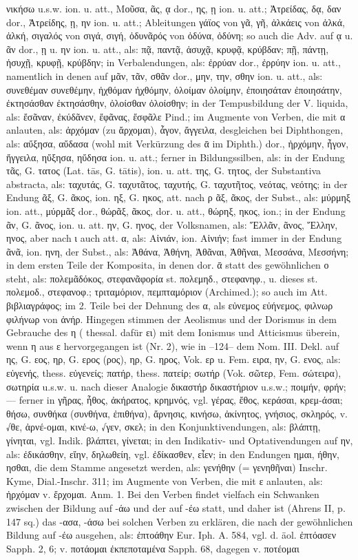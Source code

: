 νικήσω u.s.w. ion. u. att., Μοῦσα, ᾶς, ᾳ dor., ης, ῃ ion. u. att.; Ἀτρείδας, δᾳ, δαν dor., Ἀτρείδης, ῃ, ην ion. u. att.; Ableitungen γάϊος von γᾶ, γῆ, ἀλκάεις von ἀλκά, ἀλκή, σιγαλός von σιγά, σιγή, ὀδυνᾶρός von ὀδύνα, ὀδύνη; so auch die Adv. auf ᾳ u. ᾶν dor., ῃ u. ην ion. u. att., als: πᾷ, παντᾷ, ἁσυχᾷ, κρυφᾷ, κρύβδαν; πῇ, πάντῃ, ἡσυχῇ, κρυφῇ, κρύβδην; in Verbalendungen, als: ἐρρύαν dor., ἐρρύην ion. u. att., namentlich in denen auf μᾶν, τᾶν, σθᾶν dor., μην, την, σθην ion. u. att., als: συνεθέμαν συνεθέμην, ἠχθόμαν ἠχθόμην, ὀλοίμαν ὀλοίμην, ἐποιησάταν ἐποιησάτην, ἐκτησάσθαν ἐκτησάσθην, ὀλοίσθαν ὀλοίσθην; in der Tempusbildung der V. liquida, als: ἔσᾶναν, ἐκύδᾶνεν, ἔφᾶνας, ἔσφᾶλε Pind.; im Augmente von Verben, die mit α anlauten, als: ἀρχόμαν (zu ἄρχομαι), ἆγον, ἄγγειλα, desgleichen bei Diphthongen, als: αὔξησα, αὔδασα (wohl mit Verkürzung des ᾱ im Diphth.) dor., ἠρχόμην, ἦγον, ἤγγειλα, ηὔξησα, ηὔδησα ion. u. att.; ferner in Bildungssilben, als: in der Endung τᾶς, G. τατος (Lat. tās, G. tātis), ion. u. att. της, G. τητος, der Substantiva abstracta, als: ταχυτάς, G. ταχυτᾶτος, ταχυτής, G. ταχυτῆτος, νεότας, νεότης; in der Endung ᾶξ, G. ᾶκος, ion. ηξ, G. ηκος, att. nach ρ ᾶξ, ᾶκος, der Subst., als: μύρμηξ ion. att., μύρμᾶξ dor., θώρᾶξ, ᾶκος, dor. u. att., θώρηξ, ηκος, ion.; in der Endung ᾶν, G. ᾶνος, ion. u. att. ην, G. ηνος, der Volksnamen, als: Ἕλλᾶν, ᾶνος, Ἕλλην, ηνος, aber nach ι auch att. α, als: Αἰνιάν, ion. Αἰνιήν; fast immer in der Endung ᾶνᾶ, ion. ηνη, der Subst., als: Ἀθάνα, Ἀθήνη, Ἀθᾶναι, Ἀθῆναι, Μεσσάνα, Μεσσήνη; in dem ersten Teile der Komposita, in denen dor. ᾱ statt des gewöhnlichen ο steht, als: πολεμᾶδόκος, στεφανᾶφορία st. πολεμηδ., στεφανηφ., u. dieses st. πολεμοδ., στεφανοφ.; τριταμόριον, πεμπταμόριον (Archimed.); so auch im Att. βιβλιαγράφος; im 2. Teile bei der Dehnung des α, als εὐνεμος εὐήνεμος, φιλνωρ φιλήνωρ von ἀνήρ. Hingegen stimmen der Aeolismus und der Dorismus in dem Gebrauche des η ( thessal. dafür ει) mit dem Ionismus und Atticismus überein, wenn η aus ε hervorgegangen ist (Nr. 2), wie in --124-- dem Nom. III. Dekl. auf ης, G. εος, ηρ, G. ερος (ρος), ηρ, G. ηρος, Vok. ερ u. Fem. ειρα, ην, G. ενος, als: εὐγενής,  thess. εὐγενείς; πατήρ,  thess. πατείρ; σωτήρ (Vok. σῶτερ, Fem. σώτειρα), σωτηρία u.s.w. u. nach dieser Analogie δικαστήρ δικαστήριον u.s.w.; ποιμήν, φρήν; — ferner in γῆρας, ἦθος, ἀκήρατος, κρημνός, vgl. γέρας, ἔθος, κεράσαι, κρεμ-άσαι; θήσω, συνθήκα (συνθήνα, ἐπιθήνα), ἄρνησις, κινήσω, ἀκίνητος, γνήσιος, σκληρός, v. √θε, ἀρνέ-ομαι, κινέ-ω, √γεν, σκελ; in den Konjunktivendungen, als: βλάπτῃ, γίνηται, vgl. Indik. βλάπτει, γίνεται; in den Indikativ- und Optativendungen auf ην, als: ἐδικάσθην, εἴην, δηλωθείη, vgl. ἐδίκασθεν, εἶεν; in den Endungen ημαι, ήθην, ησθαι, die dem Stamme angesetzt werden, als: γενήθην (= γενηθῆναι) Inschr. Kyme, Dial.-Inschr. 311; im Augmente von Verben, die mit ε anlauten, als: ἠρχόμαν v. ἔρχομαι. Anm. 1. Bei den Verben findet vielfach ein Schwanken zwischen der Bildung auf -άω und der auf -έω statt, und daher ist (Ahrens II, p. 147 sq.) das -ασα, -άσω bei solchen Verben zu erklären, die nach der gewöhnlichen Bildung auf -έω ausgehen, als: ἐπτοάθην Eur. Iph. A. 584, vgl. d. äol. ἐπτόασεν Sapph. 2, 6; v. ποτάομαι ἐκπεποταμένα Sapph. 68, dagegen v. ποτέομαι 